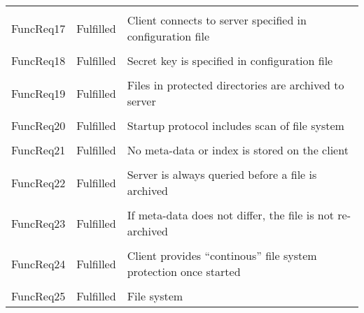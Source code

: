 \begin{longtable}{ l l p{5cm} }
    \\ \\
    FuncReq17           & Fulfilled                 & Client connects to
                                                      server specified in
                                                      configuration file
    \\ \\
    FuncReq18           & Fulfilled                 & Secret key is
                                                      specified in
                                                      configuration file
    \\ \\
    FuncReq19           & Fulfilled                 & Files in protected
                                                      directories are
                                                      archived to server
    \\ \\
    FuncReq20           & Fulfilled                 & Startup protocol
                                                      includes scan of
                                                      file system
    \\ \\
    FuncReq21           & Fulfilled                 & No meta-data or index
                                                      is stored on the
                                                      client
    \\ \\
    FuncReq22           & Fulfilled                 & Server is always
                                                      queried before a file
                                                      is archived
    \\ \\
    FuncReq23           & Fulfilled                 & If meta-data does not
                                                      differ, the file is
                                                      not re-archived
    \\ \\
    FuncReq24           & Fulfilled                 & Client provides
                                                      ``continous'' file
                                                      system protection
                                                      once started
    \\ \\
    FuncReq25           & Fulfilled                 & File system

\end{longtable}
